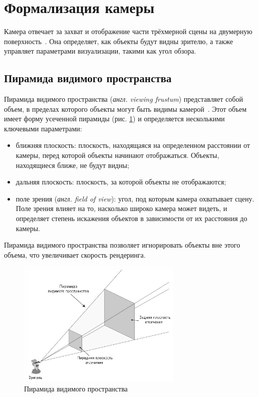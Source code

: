 \section{Формализация камеры}

Камера отвечает за захват и отображение части трёхмерной сцены на двумерную поверхность~\cite{lit12}. Она определяет, как объекты будут видны зрителю, а также управляет параметрами визуализации, такими как угол обзора.

\subsection{Пирамида видимого пространства}

Пирамида видимого пространства (\textit{англ. viewing frustum}) представляет собой объем, в пределах которого объекты могут быть видимы камерой~\cite{lit12}. Этот объем имеет форму усеченной пирамиды (рис. \ref{fig:viewing-frustum}) и определяется несколькими ключевыми параметрами:
\begin{itemize}[label=--]
	\item ближняя плоскость: плоскость, находящаяся на определенном расстоянии от камеры, перед которой объекты начинают отображаться. Объекты, находящиеся ближе, не будут видны;
	\item дальняя плоскость: плоскость, за которой объекты не отображаются;
	\item поле зрения (\textit{англ. field of view}): угол, под которым камера охватывает сцену. Поле зрения влияет на то, насколько широко камера может видеть, и определяет степень искажения объектов в зависимости от их расстояния до камеры.
\end{itemize}

Пирамида видимого пространства позволяет игнорировать объекты вне этого объема, что увеличивает скорость рендеринга.

\clearpage

\begin{figure}[h] 
	\centering
	\includegraphics[width=0.7\textwidth]{images/viewing-frustum.png}
	\caption{Пирамида видимого пространства} 
	\label{fig:viewing-frustum} 
\end{figure}

